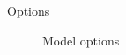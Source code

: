 \begin{frame}{Options}

	\begin{figure}[h!]\centering
	\caption{Model options}\label{Model options}
\end{figure}

\end{frame}
